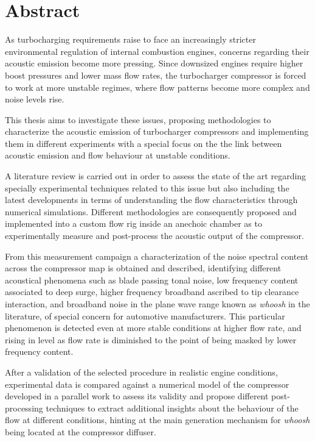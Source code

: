 \documentclass[final,twoside,11pt]{book}
\numberwithin{equation}{section}
\numberwithin{figure}{chapter}
\numberwithin{table}{chapter}
\begin{document}
\chapter*{Abstract}

\noindent As turbocharging requirements raise to face an increasingly stricter environmental regulation of internal combustion engines, concerns regarding their acoustic emission become more pressing. Since downsized engines require higher boost pressures and lower mass flow rates, the turbocharger compressor is forced to work at more unstable regimes, where flow patterns become more complex and noise levels rise. 

This thesis aims to investigate these issues, proposing methodologies to characterize the acoustic emission of turbocharger compressors and implementing them in different experiments with a special focus on the the link between acoustic emission and flow behaviour at unstable conditions.

A literature review is carried out in order to assess the state of the art regarding specially experimental techniques related to this issue but also including the latest developments in terms of understanding the flow characteristics through numerical simulations. Different methodologies are consequently proposed and implemented into a custom flow rig inside an anechoic chamber as to experimentally measure and post-process the acoustic output of the compressor.

From this measurement campaign a characterization of the noise spectral content across the compressor map is obtained and described, identifying different acoustical phenomena such as blade passing tonal noise, low frequency content associated to deep surge, higher frequency broadband ascribed to tip clearance interaction, and broadband noise in the plane wave range known as \emph{whoosh} in the literature, of special concern for automotive manufacturers. This particular phenomenon is detected even at more stable conditions at higher flow rate, and rising in level as flow rate is diminished to the point of being masked by lower frequency content.

After a validation of the selected procedure in realistic engine conditions, experimental data is compared against a numerical model of the compressor developed in a parallel work to assess its validity and propose different post-processing techniques to extract additional insights about the behaviour of the flow at different conditions, hinting at the main generation mechanism for \emph{whoosh} being located at the compressor diffuser.
\end{document}
